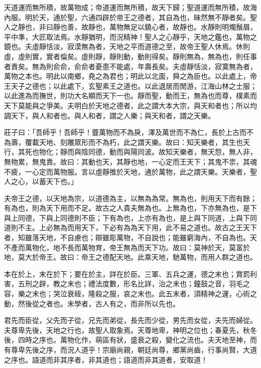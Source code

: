 
\begin{pinyinscope}
天道運而無所積，故萬物成；帝道運而無所積，故天下歸；聖道運而無所積，故海內服。明於天，通於聖，六通四辟於帝王之德者，其自為也，昧然無不靜者矣。聖人之靜也，非曰靜也善，故靜也，萬物無足以鐃心者，故靜也。水靜則明燭鬚眉，平中準，大匠取法焉。水靜猶明，而況精神！聖人之心靜乎，天地之鑑也，萬物之鏡也。夫虛靜恬淡，寂漠無為者，天地之平而道德之至，故帝王聖人休焉。休則虛，虛則實，實者倫矣。虛則靜，靜則動，動則得矣。靜則無為，無為也，則任事者責矣。無為則俞俞，俞俞者憂患不能處，年壽長矣。夫虛靜恬淡，寂寞無為者，萬物之本也。明此以南鄉，堯之為君也；明此以北面，舜之為臣也。以此處上，帝王天子之德也；以此處下，玄聖素王之道也。以此退居而閒游，江海山林之士服；以此進為而撫世，則功大名顯而天下一也。靜而聖，動而王，無為也而尊，樸素而天下莫能與之爭美。夫明白於天地之德者，此之謂大本大宗，與天和者也；所以均調天下，與人和者也。與人和者，謂之人樂；與天和者，謂之天樂。

莊子曰：「吾師乎！吾師乎！虀萬物而不為戾，澤及萬世而不為仁，長於上古而不為壽，覆載天地、刻雕眾形而不為朽，此之謂天樂。故曰：知天樂者，其生也天行，其死也物化；靜而與陰同德，動而與陽同波。故知天樂者，無天怨，無人非，無物累，無鬼責。故曰：其動也天，其靜也地，一心定而王天下；其鬼不祟，其魂不疲，一心定而萬物服。言以虛靜推於天地，通於萬物，此之謂天樂。天樂者，聖人之心，以蓄天下也。」

夫帝王之德，以天地為宗，以道德為主，以無為為常。無為也，則用天下而有餘；有為也，則為天下用而不足。故古之人貴夫無為也。上無為也，下亦無為也，是下與上同德，下與上同德則不臣；下有為也，上亦有為也，是上與下同道，上與下同道則不主。上必無為而用天下，下必有為為天下用，此不易之道也。故古之王天下者，知雖落天地，不自慮也；辯雖彫萬物，不自說也；能雖窮海內，不自為也。天不產而萬物化，地不長而萬物育，帝王無為而天下功。故曰：莫神於天，莫富於地，莫大於帝王。故曰：帝王之德配天地。此乘天地，馳萬物，而用人群之道也。

本在於上，末在於下；要在於主，詳在於臣。三軍、五兵之運，德之末也；賞罰利害，五刑之辟，教之末也；禮法度數，形名比詳，治之末也；鐘鼓之音，羽毛之容，樂之末也；哭泣衰絰，隆殺之服，哀之末也。此五末者，須精神之運，心術之動，然後從之者也。末學者，古人有之，而非所以先也。

君先而臣從，父先而子從，兄先而弟從，長先而少從，男先而女從，夫先而婦從。夫尊卑先後，天地之行也，故聖人取象焉。天尊地卑，神明之位也；春夏先，秋冬後，四時之序也。萬物化作，萌區有狀，盛衰之殺，變化之流也。夫天地至神，而有尊卑先後之序，而況人道乎！宗廟尚親，朝廷尚尊，鄉黨尚齒，行事尚賢，大道之序也。語道而非其序者，非其道也；語道而非其道者，安取道！


\end{pinyinscope}
